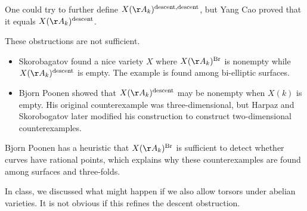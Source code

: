 \documentclass[../notes.tex]{subfiles}
\begin{document}
\begin{remark}
	One could try to further define $X(\AA_k)^{\mathrm{descent},\mathrm{descent}}$, but Yang Cao proved that it equals $X(\AA_k)^{\mathrm{descent}}$.
\end{remark}
\begin{remark}
	These obstructions are not sufficient.
	\begin{itemize}
		\item Skorobagatov found a nice variety $X$ where $X(\AA_k)^{\mathrm{Br}}$ is nonempty while $X(\AA_k)^{\mathrm{descent}}$ is empty. The example is found among bi-elliptic surfaces.
		\item Bjorn Poonen showed that $X(\AA_k)^{\mathrm{descent}}$ may be nonempty when $X(k)$ is empty. His original counterexample was three-dimensional, but Harpaz and Skorobogatov later modified his construction to construct two-dimensional counterexamples.
	\end{itemize}
\end{remark}
\begin{remark}
	Bjorn Poonen has a heuristic that $X(\AA_k)^{\mathrm{Br}}$ is sufficient to detect whether curves have rational points, which explains why these counterexamples are found among surfaces and three-folds.
\end{remark}
\begin{remark}
	In class, we discussed what might happen if we also allow torsors under abelian varieties. It is not obvious if this refines the descent obstruction.
\end{remark}
\end{document}
